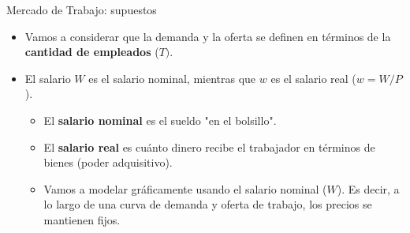 \documentclass{beamer}
\begin{document}
\begin{frame}{Mercado de Trabajo: supuestos}
    \vspace{0.3cm}
    \begin{itemize}
        \item Vamos a considerar que la demanda y la oferta se definen en términos de la \textbf{cantidad de empleados} ($T)$. \vspace{0.2cm}
        \item El salario $W$ es el salario nominal, mientras que $w$ es el salario real ($w=W/P$).  \vspace{0.1cm}
        \begin{itemize}
        \item El \textbf{salario nominal} es el sueldo "en el bolsillo". \vspace{0.1cm}
        \item El \textbf{salario real} es cuánto dinero recibe el trabajador en términos de bienes (poder adquisitivo). \vspace{0.1cm}
        \item Vamos a modelar gráficamente usando el salario nominal ($W$). Es decir, a lo largo de una curva de demanda y oferta de trabajo, los precios se mantienen fijos. 
    \end{itemize}
    \end{itemize}


\end{frame}
\end{document}
